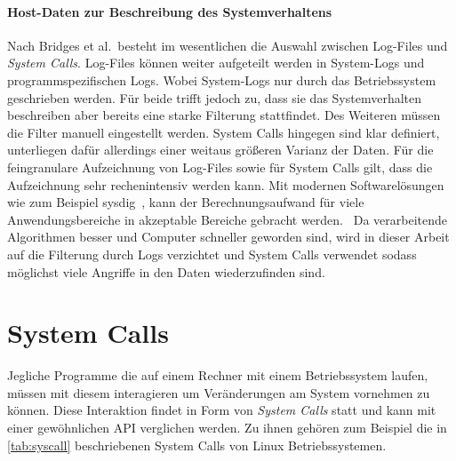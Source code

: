             \paragraph{Host-Daten zur Beschreibung des Systemverhaltens}
                 
            Nach Bridges et al.\ besteht im wesentlichen die Auswahl zwischen Log-Files und \textit{System Calls}. 
            Log-Files können weiter aufgeteilt werden in System-Logs und programmspezifischen Logs.
            Wobei System-Logs nur durch das Betriebssystem geschrieben werden.
            Für beide trifft jedoch zu, dass sie das Systemverhalten beschreiben aber bereits eine starke Filterung stattfindet.
            Des Weiteren müssen die Filter manuell eingestellt werden.
            System Calls hingegen sind klar definiert, unterliegen dafür allerdings einer weitaus größeren Varianz der Daten.
            Für die feingranulare Aufzeichnung von Log-Files sowie für System Calls gilt, dass die Aufzeichnung sehr rechenintensiv werden kann.
            Mit modernen Softwarelösungen wie zum Beispiel sysdig~\cite{SYSDIG}, kann der Berechnungsaufwand für viele Anwendungsbereiche in akzeptable Bereiche gebracht werden.~\cite{HIDSSURVEY2019bridges}
            {\color{red} Da verarbeitende Algorithmen besser und Computer schneller geworden sind, wird in dieser Arbeit auf die Filterung durch Logs verzichtet und System Calls verwendet sodass möglichst viele Angriffe in den Daten wiederzufinden sind.}

    \section{System Calls}\label{sec:syscalls}
        Jegliche Programme die auf einem Rechner mit einem Betriebssystem laufen, müssen mit diesem interagieren um Veränderungen am System vornehmen zu können.
        Diese Interaktion findet in Form von \textit{System Calls} statt und kann mit einer gewöhnlichen \ac{API} verglichen werden.
        Zu ihnen gehören zum Beispiel die in \autoref{tab:syscall} beschriebenen System Calls von Linux Betriebssystemen.

